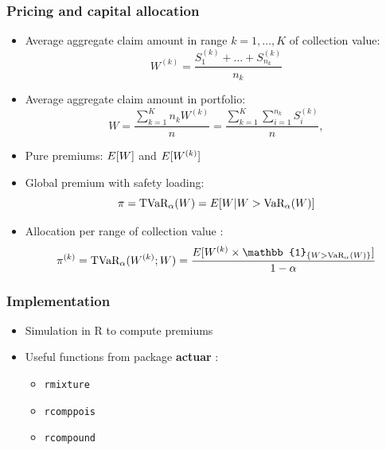 \begin{frame}
  \frametitle{Pricing and capital allocation}

  \begin{itemize}
  \item Average aggregate claim amount in range
    $k = 1, \dots, K$ of collection value:
    \begin{equation*}
      W^{(k)} = \frac{S_1^{(k)} + \dots + S_{n_k}^{(k)}}{n_k}
    \end{equation*}
  \item Average aggregate claim amount in portfolio:
    \begin{equation*}
      W = \frac{\sum_{k = 1}^K n_k W^{(k)}}{n}
      = \frac{\sum_{k = 1}^K \sum_{i = 1}^{n_k} S_i^{(k)}}{n},
    \end{equation*}
  \item<2-> Pure premiums: $E [ W ]$ and $E [ W^{(k)} ]$
  \item<3-> Global premium with safety loading:
    \begin{equation*}
      \pi = \text{TVaR}_\alpha(W) = E [ W|W > \text{VaR}_\alpha(W) ]
    \end{equation*}
  \item<4-> Allocation per range of collection value
    \citep[section~10.2.3]{Marceau:modelisation:2013}:
    \begin{equation*}
      \pi^{(k)} = \TVaR_\alpha(W^{(k)}; W) =
      \frac{\esp{W^{(k)} \times \mathbb{1}_{\{W > \VaR_\alpha(W)\}}}}{1 - \alpha}
    \end{equation*}
  \end{itemize}
\end{frame}

\begin{frame}
  \frametitle{Implementation}

  \begin{itemize}
  \item Simulation in R to compute premiums
  \item Useful functions from package \textbf{actuar} \citep{actuar}:
    \begin{itemize}
    \item[] \texttt{rmixture}
    \item[] \texttt{rcomppois}
    \item[] \texttt{rcompound}
    \end{itemize}
  \end{itemize}
\end{frame}

